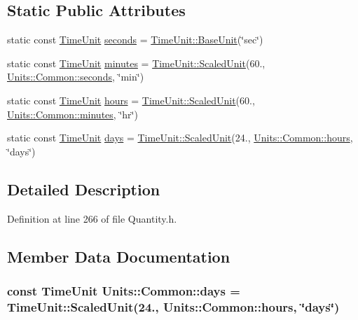 \subsection*{Static Public Attributes}
\begin{DoxyCompactItemize}
\item 
static const \hyperlink{_quantity_8h_ad9301a6dca9ca8d1452914698bfdf893}{Time\+Unit} \hyperlink{class_units_1_1_common_a0cc948d0fded9699abb22295119fff7b}{seconds} = \hyperlink{class_unit_aa2102921ecd21d9938707db58e4df964}{Time\+Unit\+::\+Base\+Unit}(\char`\"{}sec\char`\"{})
\item 
static const \hyperlink{_quantity_8h_ad9301a6dca9ca8d1452914698bfdf893}{Time\+Unit} \hyperlink{class_units_1_1_common_ae00592bb8573bd91d034a0b23f4449d6}{minutes} = \hyperlink{class_unit_aa44ac3044c0cdb834cd220652e5d1c40}{Time\+Unit\+::\+Scaled\+Unit}(60., \hyperlink{class_units_1_1_common_a0cc948d0fded9699abb22295119fff7b}{Units\+::\+Common\+::seconds}, \char`\"{}min\char`\"{})
\item 
static const \hyperlink{_quantity_8h_ad9301a6dca9ca8d1452914698bfdf893}{Time\+Unit} \hyperlink{class_units_1_1_common_a85905b04a8c1fa4058249d06c81828c7}{hours} = \hyperlink{class_unit_aa44ac3044c0cdb834cd220652e5d1c40}{Time\+Unit\+::\+Scaled\+Unit}(60., \hyperlink{class_units_1_1_common_ae00592bb8573bd91d034a0b23f4449d6}{Units\+::\+Common\+::minutes}, \char`\"{}hr\char`\"{})
\item 
static const \hyperlink{_quantity_8h_ad9301a6dca9ca8d1452914698bfdf893}{Time\+Unit} \hyperlink{class_units_1_1_common_ade670c3d1602d80753114646787c853e}{days} = \hyperlink{class_unit_aa44ac3044c0cdb834cd220652e5d1c40}{Time\+Unit\+::\+Scaled\+Unit}(24., \hyperlink{class_units_1_1_common_a85905b04a8c1fa4058249d06c81828c7}{Units\+::\+Common\+::hours}, \char`\"{}days\char`\"{})
\end{DoxyCompactItemize}


\subsection{Detailed Description}


Definition at line 266 of file Quantity.\+h.



\subsection{Member Data Documentation}
\hypertarget{class_units_1_1_common_ade670c3d1602d80753114646787c853e}{
\subsubsection[{days}]{\setlength{\rightskip}{0pt plus 5cm}const {\bf Time\+Unit} Units\+::\+Common\+::days = {\bf Time\+Unit\+::\+Scaled\+Unit}(24., {\bf Units\+::\+Common\+::hours}, \char`\"{}days\char`\"{})\hspace{0.3cm}{\ttfamily [static]}}}\label{class_units_1_1_common_ade670c3d1602d80753114646787c853e}


